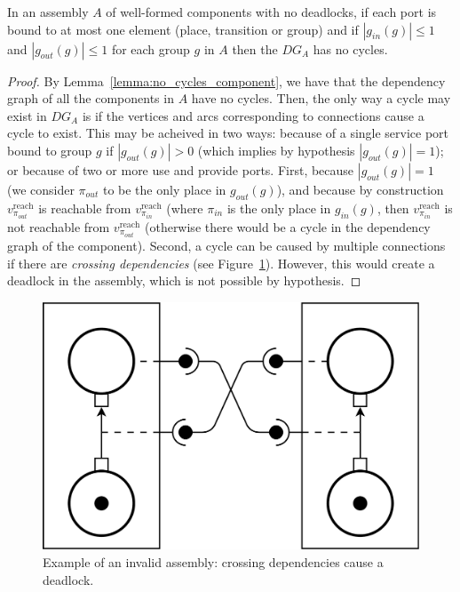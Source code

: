 \begin{lemma}
 In an assembly $A$ of well-formed components with no deadlocks, if each port
 is bound to at most one element (place, transition or group) and if
 $\left|g_{in}(g)\right|\leq 1$ and $\left|g_{out}(g)\right|\leq 1$ for each group
 $g$ in $A$ then the $DG_A$ has no cycles.
 \label{lemma:no_cycles_assembly}
\end{lemma}

\begin{proof}
 By Lemma~\ref{lemma:no_cycles_component}, we have that the dependency graph
 of all the components in $A$ have no cycles.
 Then, the only way a cycle may exist in $DG_A$ is if the vertices and arcs
 corresponding to connections cause a cycle to exist.
 This may be acheived in two ways: because of a single service port bound to
 group $g$ if $\left|g_{out}(g)\right|>0$ (which implies by hypothesis
 $\left|g_{out}(g)\right|=1$); or because of two or more use and provide ports.
 First, because $\left|g_{out}(g)\right|=1$ (we consider $\pi_{out}$ to be the only
 place in $g_{out}(g)$), and because by construction $v_{\pi_{out}}^\text{reach}$ is
 reachable from $v_{\pi_{in}}^\text{reach}$ (where $\pi_{in}$ is the only place in $g_{in}(g)$,
 then $v_{\pi_{in}}^\text{reach}$ is not reachable from $v_{\pi_{out}}^\text{reach}$ (otherwise
 there would be a cycle in the dependency graph of the component). Second, a
 cycle can be caused by multiple connections if there are \emph{crossing
 dependencies} (see Figure~\ref{fig:deadlock}). However, this would create a
 deadlock in the assembly, which is not possible by hypothesis.
\end{proof}

\begin{figure}[t]
  \begin{center}
    \includegraphics[width=0.5\linewidth]{./images/deadlock.pdf}
  \end{center}
  \caption{Example of an invalid assembly: crossing dependencies cause a deadlock.}
  \label{fig:deadlock}
\end{figure}

